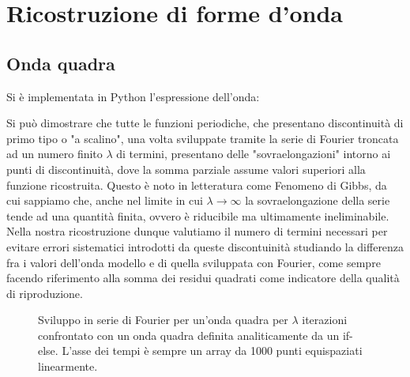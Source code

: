 \documentclass{article}[a4paper, oneside ,11pt]
\begin{document}
\section{Ricostruzione di forme d'onda}
\subsection{Onda quadra}
Si è implementata in Python l'espressione dell'onda:

Si può dimostrare che tutte le funzioni periodiche, che presentano discontinuità di primo tipo o "a scalino", una volta sviluppate tramite la serie di Fourier troncata ad un numero finito $\lambda$ di termini, presentano delle "sovraelongazioni" intorno ai punti di discontinuità, dove la somma parziale assume valori superiori alla funzione ricostruita. Questo è noto in letteratura come Fenomeno di Gibbs, da cui sappiamo che, anche nel limite in cui $\lambda \longrightarrow \infty$ la sovraelongazione della serie tende ad una quantità finita, ovvero è riducibile ma ultimamente ineliminabile. Nella nostra ricostruzione dunque valutiamo il numero di termini necessari per evitare errori sistematici introdotti da queste discontuinità studiando la differenza fra i valori dell'onda modello e di quella sviluppata con Fourier, come sempre facendo riferimento alla somma dei residui quadrati come indicatore della qualità di riproduzione.
\begin{figure}[!htb]
	\scalebox{0.55}{}\hfill \scalebox{0.55}{}
	\scalebox{0.55}{}\hfill \scalebox{0.55}{}
 	\caption{Sviluppo in serie di Fourier per un’onda quadra per $\lambda$ iterazioni confrontato con un onda quadra definita analiticamente da un if-else. L'asse dei tempi è sempre un array da 1000 punti equispaziati linearmente.
 \label{plt:sqw}}
\end{figure}

\end{document}
